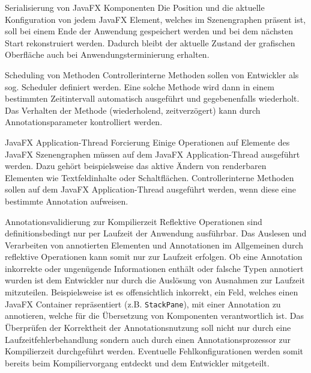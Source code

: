 \begin{freq}[o]{Serialisierung von JavaFX Komponenten}
	Die Position und die aktuelle Konfiguration von jedem JavaFX Element, welches im Szenengraphen präsent ist, soll bei einem Ende der Anwendung gespeichert werden und bei dem nächsten Start rekonstruiert werden. Dadurch bleibt der aktuelle Zustand der grafischen Oberfläche auch bei Anwendungsterminierung erhalten.
\end{freq}
\begin{freq}[o]{Scheduling von Methoden}
	Controllerinterne Methoden sollen von Entwickler als sog. Scheduler definiert werden. Eine solche Methode wird dann in einem bestimmten Zeitintervall automatisch ausgeführt und gegebenenfalls wiederholt. Das Verhalten der Methode (wiederholend, zeitverzögert) kann durch Annotationsparameter kontrolliert werden.
\end{freq}
\begin{freq}[o]{JavaFX Application-Thread Forcierung}
	Einige Operationen auf Elemente des JavaFX Szenengraphen müssen auf dem JavaFX Application-Thread ausgeführt werden. Dazu gehört beispielsweise das aktive Ändern von renderbaren Elementen wie Textfeldinhalte oder Schaltflächen. Controllerinterne Methoden sollen auf dem JavaFX Application-Thread ausgeführt werden, wenn diese eine bestimmte Annotation aufweisen.
\end{freq}
\begin{freq}[o]{Annotationsvalidierung zur Kompilierzeit}
	Reflektive Operationen sind definitionsbedingt nur per Laufzeit der Anwendung ausführbar. Das Auslesen und Verarbeiten von annotierten Elementen und Annotationen im Allgemeinen durch reflektive Operationen kann somit nur zur Laufzeit erfolgen. Ob eine Annotation inkorrekte oder ungenügende Informationen enthält oder falsche Typen annotiert wurden ist dem Entwickler nur durch die Auslösung von Ausnahmen zur Laufzeit mitzuteilen. Beispielsweise ist es offensichtlich inkorrekt, ein Feld, welches einen JavaFX Container repräsentiert (z.B. \texttt{StackPane}), mit einer Annotation zu annotieren, welche für die Übersetzung von Komponenten verantwortlich ist. Das Überprüfen der Korrektheit der Annotationsnutzung soll nicht nur durch eine Laufzeitfehlerbehandlung sondern auch durch einen Annotationsprozessor zur Kompilierzeit durchgeführt werden. Eventuelle Fehlkonfigurationen werden somit bereits beim Kompiliervorgang entdeckt und dem Entwickler mitgeteilt.
\end{freq}
